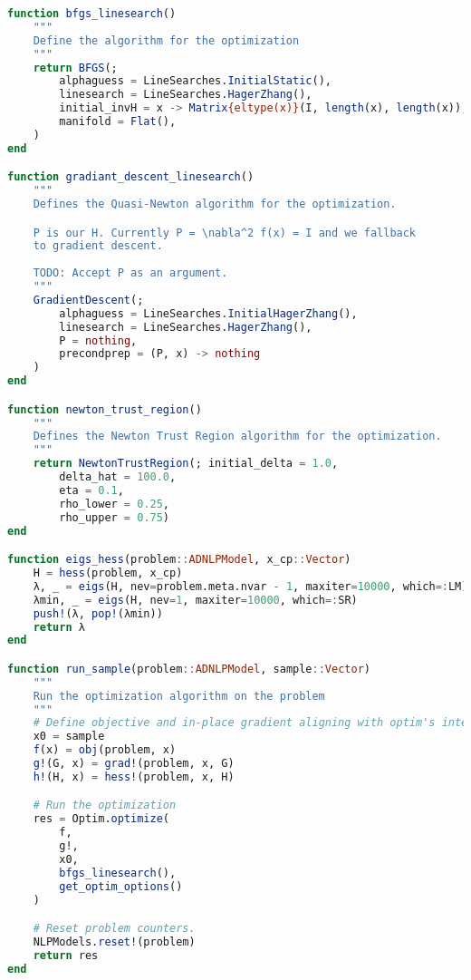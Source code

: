 \documentclass[10pt]{article}
\begin{document}
\begin{lstlisting}[language=julia, caption={Algorithm 16.5}, label={lst:problem-sampling}]
function bfgs_linesearch()
    """
    Define the algorithm for the optimization
    """
    return BFGS(;
        alphaguess = LineSearches.InitialStatic(),
        linesearch = LineSearches.HagerZhang(),
        initial_invH = x -> Matrix{eltype(x)}(I, length(x), length(x)),
        manifold = Flat(),
    )
end

function gradiant_descent_linesearch()
    """
    Defines the Quasi-Newton algorithm for the optimization.

    P is our H. Currently P = \nabla^2 f(x) = I and we fallback
    to gradient descent. 
    
    TODO: Accept P as an argument.
    """
    GradientDescent(; 
        alphaguess = LineSearches.InitialHagerZhang(),
        linesearch = LineSearches.HagerZhang(),
        P = nothing,
        precondprep = (P, x) -> nothing
    )
end

function newton_trust_region()
    """
    Defines the Newton Trust Region algorithm for the optimization.
    """
    return NewtonTrustRegion(; initial_delta = 1.0,
        delta_hat = 100.0,
        eta = 0.1,
        rho_lower = 0.25,
        rho_upper = 0.75)
end

function eigs_hess(problem::ADNLPModel, x_cp::Vector)
    H = hess(problem, x_cp)
    λ, _ = eigs(H, nev=problem.meta.nvar - 1, maxiter=10000, which=:LM)
    λmin, _ = eigs(H, nev=1, maxiter=10000, which=:SR)
    push!(λ, pop!(λmin))
    return λ
end

function run_sample(problem::ADNLPModel, sample::Vector)
    """
    Run the optimization algorithm on the problem
    """
    # Define objective and in-place gradient aligning with optim's interface.
    x0 = sample
    f(x) = obj(problem, x)
    g!(G, x) = grad!(problem, x, G)
    h!(H, x) = hess!(problem, x, H)

    # Run the optimization
    res = Optim.optimize(
        f, 
        g!, 
        x0, 
        bfgs_linesearch(),
        get_optim_options()
    )

    # Reset problem counters.
    NLPModels.reset!(problem)
    return res
end


\end{lstlisting}
\end{document}
